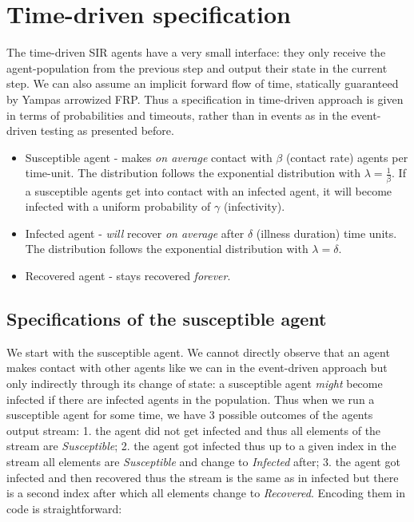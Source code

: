 \section{Time-driven specification}
\label{sec:timedriven_specification}
The time-driven SIR agents have a very small interface: they only receive the agent-population from the previous step and output their state in the current step. We can also assume an implicit forward flow of time, statically guaranteed by Yampas arrowized FRP. Thus a specification in time-driven approach is given in terms of probabilities and timeouts, rather than in events as in the event-driven testing as presented before.

\begin{itemize}
	\item Susceptible agent - makes \textit{on average} contact with $\beta$ (contact rate) agents per time-unit. The distribution follows the exponential distribution with $\lambda = \frac{1}{\beta}$. If a susceptible agents get into contact with an infected agent, it will become infected with a uniform probability of $\gamma$ (infectivity).
	
	\item Infected agent - \textit{will} recover \textit{on average} after $\delta$ (illness duration) time units. The distribution follows the exponential distribution with $\lambda = \delta$.

	\item Recovered agent - stays recovered \textit{forever}.
\end{itemize}

\subsection{Specifications of the susceptible agent}
We start with the susceptible agent. We cannot directly observe that an agent makes contact with other agents like we can in the event-driven approach but only indirectly through its change of state: a susceptible agent \textit{might} become infected if there are infected agents in the population.
Thus when we run a susceptible agent for some time, we have 3 possible outcomes of the agents output stream: 1. the agent did not get infected and thus all elements of the stream are \textit{Susceptible}; 2. the agent got infected thus up to a given index in the stream all elements are \textit{Susceptible} and change to \textit{Infected} after; 3. the agent got infected and then recovered thus the stream is the same as in infected but there is a second index after which all elements change to \textit{Recovered}. Encoding them in code is straightforward:

